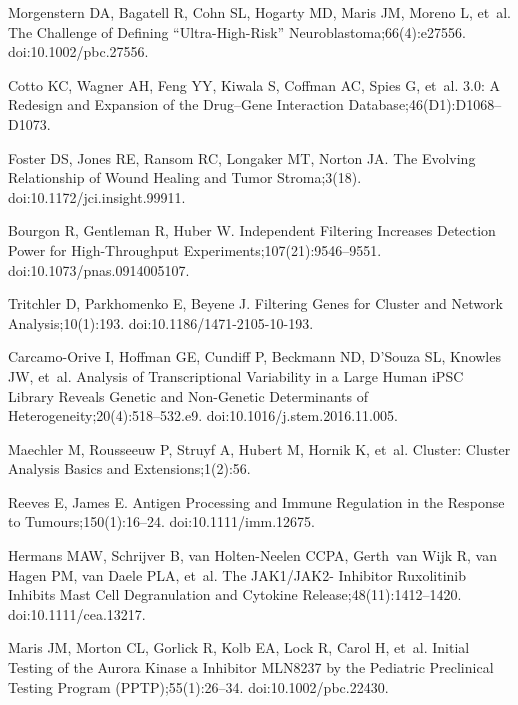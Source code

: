 \documentclass[10pt,letterpaper]{article}
\begin{document}
\begin{thebibliography}{10}
	Morgenstern DA, Bagatell R, Cohn SL, Hogarty MD, Maris JM, Moreno L, et~al.
	\newblock The Challenge of Defining “Ultra-High-Risk”
	Neuroblastoma;66(4):e27556.
	\newblock doi:{10.1002/pbc.27556}.
	
	Cotto KC, Wagner AH, Feng YY, Kiwala S, Coffman AC, Spies G, et~al.
	 3.0: A Redesign and Expansion of the Drug–Gene
	Interaction Database;46(D1):D1068--D1073.
	
	Foster DS, Jones RE, Ransom RC, Longaker MT, Norton JA.
	\newblock The Evolving Relationship of Wound Healing and Tumor Stroma;3(18).
	\newblock doi:{10.1172/jci.insight.99911}.
	
	Bourgon R, Gentleman R, Huber W.
	\newblock Independent Filtering Increases Detection Power for High-Throughput
	Experiments;107(21):9546--9551.
	\newblock doi:{10.1073/pnas.0914005107}.
	
	Tritchler D, Parkhomenko E, Beyene J.
	\newblock Filtering {{Genes}} for {{Cluster}} and {{Network
			Analysis}};10(1):193.
	\newblock doi:{10.1186/1471-2105-10-193}.
	
	Carcamo-Orive I, Hoffman GE, Cundiff P, Beckmann ND, D’Souza SL, Knowles JW,
	et~al.
	\newblock Analysis of {{Transcriptional Variability}} in a {{Large Human iPSC
			Library Reveals Genetic}} and {{Non}}-Genetic {{Determinants}} of
	{{Heterogeneity}};20(4):518--532.e9.
	\newblock doi:{10.1016/j.stem.2016.11.005}.
	
	Maechler M, Rousseeuw P, Struyf A, Hubert M, Hornik K, et~al.
	\newblock Cluster: Cluster Analysis Basics and Extensions;1(2):56.
	
	Reeves E, James E.
	\newblock Antigen Processing and Immune Regulation in the Response to
	Tumours;150(1):16--24.
	\newblock doi:{10.1111/imm.12675}.
	
	Hermans MAW, Schrijver B, van Holten-Neelen CCPA, Gerth~van Wijk R, van Hagen
	PM, van Daele PLA, et~al.
	\newblock The {{JAK1}}/{{JAK2}}- Inhibitor Ruxolitinib Inhibits Mast Cell
	Degranulation and Cytokine Release;48(11):1412--1420.
	\newblock doi:{10.1111/cea.13217}.
	
	Maris JM, Morton CL, Gorlick R, Kolb EA, Lock R, Carol H, et~al.
	\newblock Initial Testing of the Aurora Kinase a Inhibitor {{MLN8237}} by the
	{{Pediatric Preclinical Testing Program}} ({{PPTP}});55(1):26--34.
	\newblock doi:{10.1002/pbc.22430}.
	

\end{thebibliography}
\end{document}
